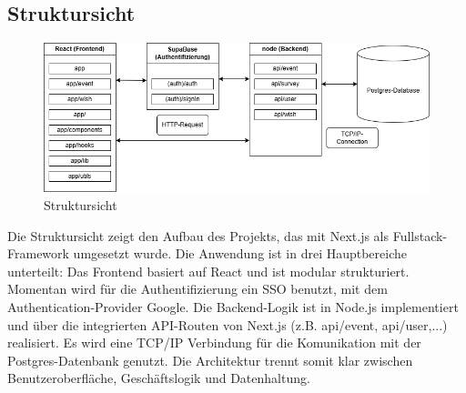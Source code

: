 \documentclass[a4paper,12pt]{article}
\begin{document}
\subsection{Struktursicht}
\begin{figure}[H]
  \centering
  \includegraphics[width=1\textwidth]{Abbildungen/struktursicht.png}
  \caption{Struktursicht}
  \label{fig:struktursicht}
\end{figure}
Die Struktursicht zeigt den Aufbau des Projekts, das mit Next.js als Fullstack-Framework umgesetzt wurde. Die Anwendung ist in drei Hauptbereiche unterteilt: Das Frontend basiert auf React und ist modular strukturiert. Momentan wird für die Authentifizierung ein SSO benutzt, mit dem Authentication-Provider Google. Die Backend-Logik ist in Node.js implementiert und über die integrierten API-Routen von Next.js (z.B. api/event, api/user,...) realisiert. Es wird eine TCP/IP Verbindung für die Komunikation mit der Postgres-Datenbank genutzt. Die Architektur trennt somit klar zwischen Benutzeroberfläche, Geschäftslogik und Datenhaltung.

\end{document}
